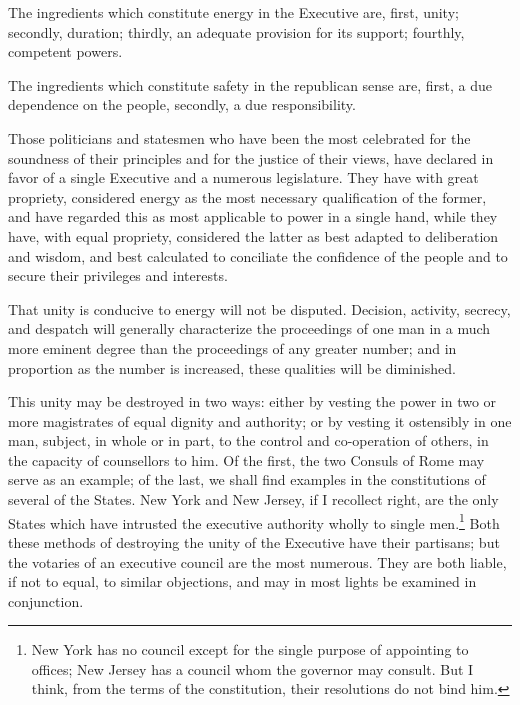 The ingredients which constitute energy in the Executive are, first, unity; secondly, duration; thirdly, an adequate provision for its support; fourthly, competent powers.

The ingredients which constitute safety in the republican sense are, first, a due dependence on the people, secondly, a due responsibility.

Those politicians and statesmen who have been the most celebrated for the soundness of their principles and for the justice of their views, have declared in favor of a single Executive and a numerous legislature. 
They have with great propriety, considered energy as the most necessary qualification of the former, and have regarded this as most applicable to power in a single hand, while they have, with equal propriety, considered the latter as best adapted to deliberation and wisdom, and best calculated to conciliate the confidence of the people and to secure their privileges and interests.

That unity is conducive to energy will not be disputed. 
Decision, activity, secrecy, and despatch will generally characterize the proceedings of one man in a much more eminent degree than the proceedings of any greater number; and in proportion as the number is increased, these qualities will be diminished.

This unity may be destroyed in two ways: either by vesting the power in two or more magistrates of equal dignity and authority; or by vesting it ostensibly in one man, subject, in whole or in part, to the control and co-operation of others, in the capacity of counsellors to him. 
Of the first, the two Consuls of Rome may serve as an example; of the last, we shall find examples in the constitutions of several of the States. 
New York and New Jersey, if I recollect right, are the only States which have intrusted the executive authority wholly to single men.\footnote{New York has no council except for the single purpose of appointing to offices; New Jersey has a council whom the governor may consult. 
But I think, from the terms of the constitution, their resolutions do not bind him.} Both these methods of destroying the unity of the Executive have their partisans; but the votaries of an executive council are the most numerous. 
They are both liable, if not to equal, to similar objections, and may in most lights be examined in conjunction.

